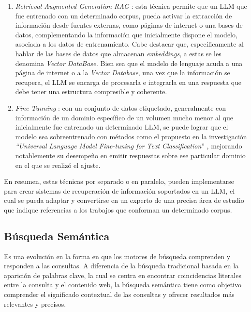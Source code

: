 \documentclass[
  12pt,
  openany]{book}
\begin{document}
\begin{enumerate}
\def\labelenumi{\arabic{enumi}.}
\item
  \emph{Retrieval Augmented Generation RAG} \citep{lewis2020}: esta técnica permite que un LLM que fue entrenado con un determinado corpus, pueda activar la extracción de información desde fuentes externas, como páginas de internet o una bases de datos, complementando la información que inicialmente dispone el modelo, asociada a los datos de entrenamiento. Cabe destacar que, específicamente al hablar de las bases de datos que almacenan \emph{embeddings}, a estas se les denomina \emph{Vector DataBase.} Bien sea que el modelo de lenguaje acuda a una página de internet o a la \emph{Vector Database}, una vez que la información se recupera, el LLM se encarga de procesarla e integrarla en una respuesta que debe tener una estructura compresible y coherente.
\item
  \emph{Fine Tunning} \citep{lv2023}: con un conjunto de datos etiquetado, generalmente con información de un dominio específico de un volumen mucho menor al que inicialmente fue entrenado un determinado LLM, se puede lograr que el modelo sea sobreentrenado con métodos como el propuesto en la investigación \emph{``Universal Language Model Fine-tuning for Text Classification}'' \citep{howard2018}, mejorando notablemente su desempeño en emitir respuestas sobre ese particular dominio en el que se realizó el ajuste.
\end{enumerate}

En resumen, estas técnicas por separado o en paralelo, pueden implementarse para crear sistemas de recuperación de información soportados en un LLM, el cual se pueda adaptar y convertirse en un experto de una precisa área de estudio que indique referencias a los trabajos que conforman un determinado corpus.

\hypertarget{busquedasemantica}{%
\subsection{Búsqueda Semántica}\label{busquedasemantica}}

Es una evolución en la forma en que los motores de búsqueda comprenden y responden a las consultas. A diferencia de la búsqueda tradicional basada en la aparición de palabras clave, la cual se centra en encontrar coincidencias literales entre la consulta y el contenido web, la búsqueda semántica tiene como objetivo comprender el significado contextual de las consultas y ofrecer resultados más relevantes y precisos.
\end{document}
